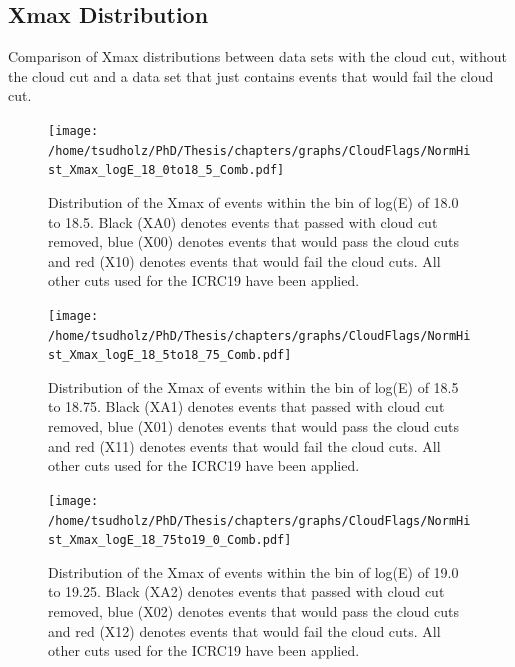 %


\subsection{Xmax Distribution}

Comparison of Xmax distributions between data sets with the cloud cut, without the cloud cut and a data set that just contains events that would fail the cloud cut.

\begin{figure}
\centering
\texttt{[image: /home/tsudholz/PhD/Thesis/chapters/graphs/CloudFlags/NormHist\_Xmax\_logE\_18\_0to18\_5\_Comb.pdf]}
\caption{Distribution of the Xmax of events within the bin of log(E) of 18.0 to 18.5. Black (XA0) denotes events that passed with cloud cut removed, blue (X00) denotes events that would pass the cloud cuts and red (X10) denotes events that would fail the cloud cuts. All other cuts used for the ICRC19 have been applied.}
\end{figure}

\begin{figure}
\centering
\texttt{[image: /home/tsudholz/PhD/Thesis/chapters/graphs/CloudFlags/NormHist\_Xmax\_logE\_18\_5to18\_75\_Comb.pdf]}
\caption{Distribution of the Xmax of events within the bin of log(E) of 18.5 to 18.75. Black (XA1) denotes events that passed with cloud cut removed, blue (X01) denotes events that would pass the cloud cuts and red (X11) denotes events that would fail the cloud cuts. All other cuts used for the ICRC19 have been applied.}
\end{figure}

\begin{figure}
\centering
\texttt{[image: /home/tsudholz/PhD/Thesis/chapters/graphs/CloudFlags/NormHist\_Xmax\_logE\_18\_75to19\_0\_Comb.pdf]}
\caption{Distribution of the Xmax of events within the bin of log(E) of 19.0 to 19.25. Black (XA2) denotes events that passed with cloud cut removed, blue (X02) denotes events that would pass the cloud cuts and red (X12) denotes events that would fail the cloud cuts. All other cuts used for the ICRC19 have been applied.}
\end{figure}

